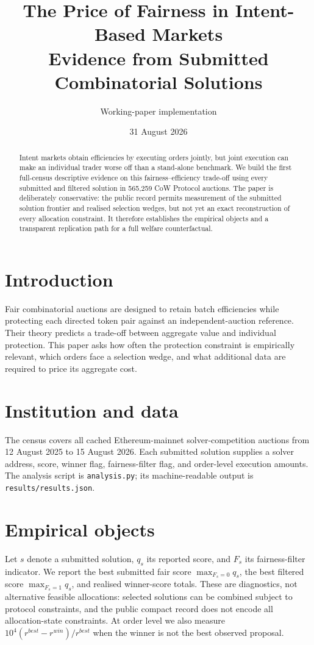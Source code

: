 \documentclass[11pt]{article}
\title{The Price of Fairness in Intent-Based Markets\\\large Evidence from Submitted Combinatorial Solutions}
\author{Working-paper implementation}
\date{31 August 2026}
\begin{document}
\maketitle
\begin{abstract}
Intent markets obtain efficiencies by executing orders jointly, but joint execution can make an individual trader worse off than a stand-alone benchmark.  We build the first full-census descriptive evidence on this fairness--efficiency trade-off using every submitted and filtered solution in 565,259 CoW Protocol auctions.  The paper is deliberately conservative: the public record permits measurement of the submitted solution frontier and realised selection wedges, but not yet an exact reconstruction of every allocation constraint.  It therefore establishes the empirical objects and a transparent replication path for a full welfare counterfactual.
\end{abstract}
\section{Introduction} Fair combinatorial auctions are designed to retain batch efficiencies while protecting each directed token pair against an independent-auction reference.  Their theory predicts a trade-off between aggregate value and individual protection.  This paper asks how often the protection constraint is empirically relevant, which orders face a selection wedge, and what additional data are required to price its aggregate cost.
\section{Institution and data} The census covers all cached Ethereum-mainnet solver-competition auctions from 12 August 2025 to 15 August 2026.  Each submitted solution supplies a solver address, score, winner flag, fairness-filter flag, and order-level execution amounts.  The analysis script is \texttt{analysis.py}; its machine-readable output is \texttt{results/results.json}.
\section{Empirical objects} Let $s$ denote a submitted solution, $q_s$ its reported score, and $F_s$ its fairness-filter indicator.  We report the best submitted fair score $\max_{F_s=0}q_s$, the best filtered score $\max_{F_s=1}q_s$, and realised winner-score totals.  These are diagnostics, not alternative feasible allocations: selected solutions can be combined subject to protocol constraints, and the public compact record does not encode all allocation-state constraints.  At order level we also measure $10^4(r^{best}-r^{win})/r^{best}$ when the winner is not the best observed proposal.
\end{document}
